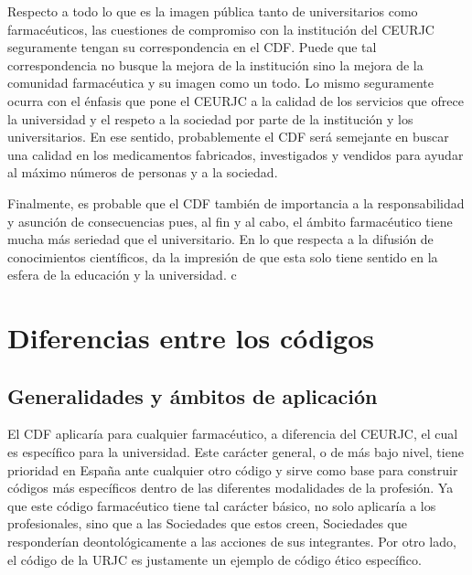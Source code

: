 \documentclass[11pt,a4paper]{article}
\begin{document}
Respecto a todo lo que es la imagen pública tanto de universitarios como farmacéuticos, las cuestiones de compromiso con la institución del CEURJC seguramente tengan su correspondencia en el CDF. Puede que tal correspondencia no busque la mejora de la institución sino la mejora de la comunidad farmacéutica y su imagen como un todo. Lo mismo seguramente ocurra con el énfasis que pone el CEURJC a la calidad de los servicios que ofrece la universidad y el respeto a la sociedad por parte de la institución y los universitarios. En ese sentido, probablemente el CDF será semejante en buscar una calidad en los medicamentos fabricados, investigados y vendidos para ayudar al máximo números de personas y a la sociedad. 

Finalmente, es probable que el CDF también de importancia a la responsabilidad y asunción de consecuencias pues, al fin y al cabo, el ámbito farmacéutico tiene mucha más seriedad que el universitario. En lo que respecta a la difusión de conocimientos científicos, da la impresión de que esta solo tiene sentido en la esfera de la educación y la universidad.
c
\section{Diferencias entre los códigos}
\subsection{Generalidades y ámbitos de aplicación}
El CDF aplicaría para cualquier farmacéutico, a diferencia del CEURJC, el cual es específico para la universidad. Este carácter general, o de más bajo nivel, tiene prioridad en España ante cualquier otro código y sirve como base para construir códigos más específicos dentro de las diferentes modalidades de la profesión. Ya que este código farmacéutico tiene tal carácter básico, no solo aplicaría a los profesionales, sino que a las Sociedades que estos creen, Sociedades que responderían deontológicamente a las acciones de sus integrantes. Por otro lado, el código de la URJC es justamente un ejemplo de código ético específico. 
\end{document}
